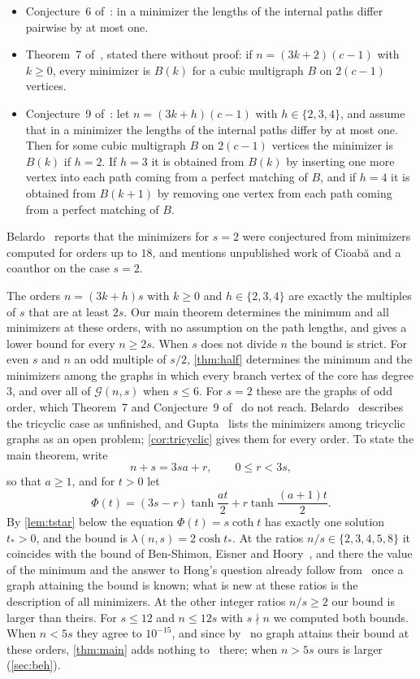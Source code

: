 \documentclass[11pt]{article}
\theoremstyle{definition}
\theoremstyle{remark}
\newcommand{\G}{\mathcal{G}}
\begin{document}
\begin{itemize}[leftmargin=2em]
\item Conjecture~6 of~\cite{Be19}: in a minimizer the lengths of the internal paths differ pairwise by at most one.
\item Theorem~7 of~\cite{Be19}, stated there without proof: if $n=(3k+2)(c-1)$ with $k\ge0$, every minimizer is
$B(k)$ for a cubic multigraph $B$ on $2(c-1)$ vertices.
\item Conjecture~9 of~\cite{Be19}: let $n=(3k+h)(c-1)$ with $h\in\{2,3,4\}$, and assume that in a
minimizer the lengths of the internal paths differ by at most one. Then for some cubic multigraph $B$ on $2(c-1)$
vertices the minimizer is $B(k)$ if $h=2$. If $h=3$ it is obtained from $B(k)$ by inserting one more vertex into each
path coming from a perfect matching of $B$, and if $h=4$ it is obtained from $B(k+1)$ by removing one vertex from each
path coming from a perfect matching of $B$.
\end{itemize}
Belardo~\cite[pp.~99 and~103]{Be19} reports that the minimizers for $s=2$ were conjectured from minimizers computed for
orders up to $18$, and mentions unpublished work of Cioab\u{a} and a coauthor on the case $s=2$.

The orders $n=(3k+h)s$ with $k\ge0$ and $h\in\{2,3,4\}$ are exactly the multiples of $s$ that are at least $2s$. Our
main theorem determines the minimum and all minimizers at these orders, with no assumption on the path lengths, and
gives a lower bound for every $n\ge2s$. When $s$ does not divide $n$ the bound is strict. For even $s$ and $n$ an odd
multiple of $s/2$, \cref{thm:half} determines the minimum and the minimizers among the graphs in which every
branch vertex of the core has degree $3$, and over all of $\G(n,s)$ when $s\le6$. For $s=2$ these are the graphs of odd order, which
Theorem~7 and Conjecture~9 of~\cite{Be19} do not reach. Belardo~\cite[p.~103]{Be19} describes the tricyclic case as
unfinished, and Gupta~\cite[slide~21]{Gu24} lists the minimizers among tricyclic graphs as an open problem;
\cref{cor:tricyclic} gives them for every order. To state the
main theorem, write
\begin{equation}\label{eq:ar}
n+s=3sa+r,\qquad 0\le r<3s ,
\end{equation}
so that $a\ge1$, and for $t>0$ let
\begin{equation}\label{eq:Phi}
\Phi(t)=(3s-r)\tanh\frac{at}{2}+r\tanh\frac{(a+1)t}{2}.
\end{equation}
By \cref{lem:tstar} below the equation $\Phi(t)=s\coth t$ has exactly one solution $t_*>0$, and the bound is
$\lambda(n,s)=2\cosh t_*$. At the ratios $n/s\in\{2,3,4,5,8\}$ it coincides with the bound of Ben-Shimon, Eisner and
Hoory~\cite{BEH}, and there the value of the minimum and the answer to Hong's question already follow from~\cite{BEH} once a
graph attaining the bound is known; what is new at these ratios is the description of all minimizers. At the other
integer ratios $n/s\ge2$ our bound is larger than theirs. For $s\le12$ and $n\le12s$ with $s\nmid n$ we computed
both bounds. When $n<5s$ they agree to $10^{-15}$, and since by~\cite{BEH} no graph attains their bound at these
orders, \cref{thm:main} adds nothing to~\cite{BEH} there; when $n>5s$ ours is larger (\cref{sec:beh}).
\end{document}
